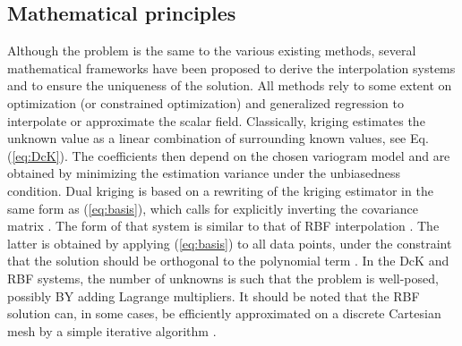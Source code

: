 \documentclass[final]{ring20}
\begin{document}
{\subsection{Mathematical principles} 

Although the problem is the same to the various existing methods, several mathematical frameworks have been proposed to derive the interpolation systems and to ensure the uniqueness of the solution. 
All methods rely to some extent on optimization (or constrained optimization) and generalized regression to interpolate or approximate the scalar field. Classically, kriging estimates the unknown value as a linear combination of surrounding known values, see Eq. (\ref{eq:DcK}). The coefficients then depend on the chosen variogram model and are obtained by minimizing the estimation variance under the unbiasedness condition. Dual kriging is based on a rewriting of the kriging estimator in the same form as (\ref{eq:basis}), which calls for explicitly inverting the covariance matrix \citep{Lajaunie1997MG,Chiles04OMSMP}. The form of that system is similar to that of RBF interpolation \citep{Dubrule1984CG,Hillier2014MG}. The latter is obtained by applying (\ref{eq:basis}) to all data points, under the constraint that the solution should be orthogonal to the polynomial term \citep{Carr2001,Hillier2014MG}. In the DcK and RBF systems, the number of unknowns is such that the problem is well-posed, possibly BY adding Lagrange multipliers. It should be noted that the RBF solution can, in some cases, be efficiently approximated on a discrete Cartesian mesh by a simple iterative algorithm \citep{Park2006ITVCG}. 

}
\end{document}
